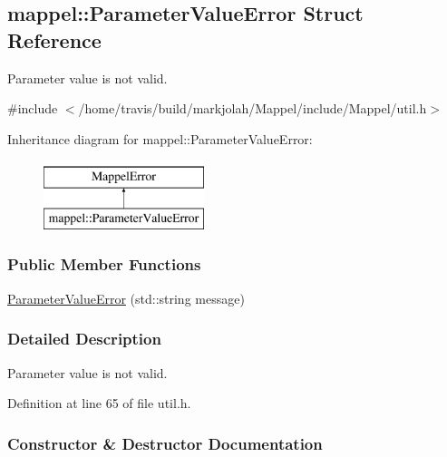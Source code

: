 \hypertarget{structmappel_1_1ParameterValueError}{}\subsection{mappel\+:\+:Parameter\+Value\+Error Struct Reference}
\label{structmappel_1_1ParameterValueError}


Parameter value is not valid.  




{\ttfamily \#include $<$/home/travis/build/markjolah/\+Mappel/include/\+Mappel/util.\+h$>$}

Inheritance diagram for mappel\+:\+:Parameter\+Value\+Error\+:\begin{figure}[H]
\begin{center}
\leavevmode
\includegraphics[height=2.000000cm]{structmappel_1_1ParameterValueError}
\end{center}
\end{figure}
\subsubsection*{Public Member Functions}
\begin{DoxyCompactItemize}
\item 
\hyperlink{structmappel_1_1ParameterValueError_af29c96326ba3a86a52f447c135d762cf}{Parameter\+Value\+Error} (std\+::string message)
\end{DoxyCompactItemize}


\subsubsection{Detailed Description}
Parameter value is not valid. 

Definition at line 65 of file util.\+h.



\subsubsection{Constructor \& Destructor Documentation}
